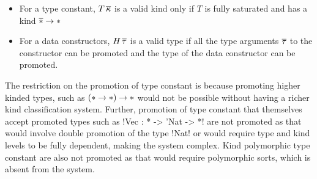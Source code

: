 \documentclass[screen,nonacm,manuscript,review]{acmart} %
\begin{document}
\begin{itemize}
\item For a type constant, $T\,\overline{\kappa}$ is a valid kind only if $T$ is fully saturated and has a kind $\overline{\ast} \to \ast$
\item For a data constructors, $H\,\overline{\tau}$ is a valid type if all the type arguments $\overline{\tau}$ to the constructor can be promoted and the type of the data constructor can be promoted.
\end{itemize}

The restriction on the promotion of type constant is because promoting higher kinded types, such as $(\ast \to \ast) \to \ast$ would not be possible without having a richer kind classification system. Further, promotion of type constant that themselves accept promoted types such as !Vec : * -> 'Nat -> *! are not promoted as that would involve double promotion of the type !Nat! or would require type and kind levels to be fully dependent, making the system complex. Kind polymorphic type constant are also not promoted as that would require polymorphic sorts, which is absent from the system.

\newcommand\KCoTAppK{
 \ib{\irule[\trule{co-$\tau\kappa$-app}]
 {\Kinding \TEnv {\kappa} {\square}}
 {\CoKinding \TEnv {\Co} {\tau \sim \tau'}};
 {\CoKinding \TEnv {\Co\App\kappa} {\tau\App\kappa \sim \tau'\App\kappa}}
 }
}

\newcommand\KCoKAbs{
 \ib{\irule[\trule{co-$\kappa$-abs}]
 {\Kinding \TEnv {\kappa} {\square}}
 {\CoKinding \TEnv {\Co} {\tau \sim \tau'}};
 {\CoKinding \TEnv {\Forall \kappa \Co} {\Forall \kappa \tau \sim {\Forall \kappa \tau'}}}
 }
}

\newcommand\KCoVarAx{
 \ib{\irule[\trule{co-$\Co$-ax}]
   {\substack {\mathlarger{c\co \Forall{\many\chi}{\Forall{\many{\alpha\co\eta}}{\tau'\sim\tau''}} \in \TEnv}\\
              {\mathlarger\Subst_\kappa = \Set{\many{\chi \mapsto \kappa}},
                \Subst_\tau=\Set{\many{\alpha\mapsto\tau}},
                \Subst_\sigma=\Set{\many{\alpha\mapsto\sigma}}}}}
   {\substack{\mathlarger{\many{\CoKinding \TEnv \Co {\tau\sim\sigma}}}\\
             {\mathlarger{\many{\CoKinding \TEnv {\tau, \sigma} {\Subst_\kappa\eta}}}}}};
 {\CoKinding \TEnv {c\App\many\kappa\App\many\Co} {\Subst_\kappa\Subst_\tau\tau' \sim \Subst_\kappa\Subst_\sigma\tau''}}
 }
}

\newcommand\KCoKappaInst{
 \ib{\irule[\trule{co-$\kappa$-inst}]
 {\Subst = \Set{\chi \mapsto \kappa}}{\Kinding \TEnv \kappa \square}
 {\CoKinding \TEnv {\Co} {\Forall\chi\tau \sim \Forall\chi{\tau'}}};
 {\CoKinding \TEnv {\Co[\kappa]} {\Subst\tau \sim \Subst\tau'}}
 }
}
\end{document}
